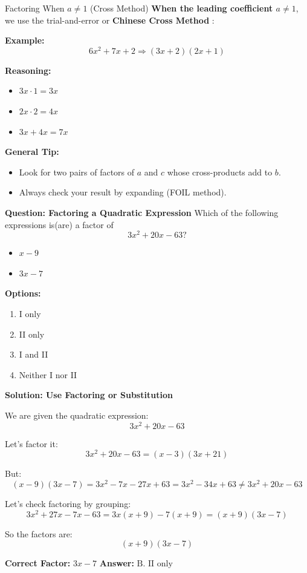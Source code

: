 \documentclass{beamer}
\begin{document}
\begin{frame}{Factoring When $a \ne 1$ (Cross Method)}
\small
\textbf{When the leading coefficient $a \ne 1$}, we use the trial-and-error or \textbf{Chinese Cross Method }:

\vspace{0.3cm}
\textbf{Example:}
\[
6x^2 + 7x + 2
\Rightarrow (3x + 2)(2x + 1)
\]

\textbf{Reasoning:}
\begin{itemize}
    \item $3x \cdot 1 = 3x$
    \item $2x \cdot 2 = 4x$
    \item $3x + 4x = 7x$
\end{itemize}

\vspace{0.2cm}
\textbf{General Tip:}
\begin{itemize}
    \item Look for two pairs of factors of $a$ and $c$ whose cross-products add to $b$.
    \item Always check your result by expanding (FOIL method).
\end{itemize}
\end{frame}


\begin{frame}{\textbf{Question: Factoring a Quadratic Expression}}
Which of the following expressions is(are) a factor of 
\[
3x^2 + 20x - 63?
\]

\begin{itemize}
    \item[I.] \(x - 9\)
    \item[II.] \(3x - 7\)
\end{itemize}

\textbf{Options:}
\begin{enumerate}
    \item[A.] I only
    \item[B.] II only
    \item[C.] I and II
    \item[D.] Neither I nor II
\end{enumerate}
\end{frame}


\begin{frame}{\textbf{Solution: Use Factoring or Substitution}}

We are given the quadratic expression:
\[
3x^2 + 20x - 63
\]

Let's factor it:
\[
3x^2 + 20x - 63 = (x - 3)(3x + 21)
\]

But:
\[
(x - 9)(3x - 7) = 3x^2 - 7x - 27x + 63 = 3x^2 - 34x + 63 \neq 3x^2 + 20x - 63
\]

Let’s check factoring by grouping:
\[
3x^2 + 27x - 7x - 63 = 3x(x + 9) -7(x + 9) = (x + 9)(3x - 7)
\]

So the factors are:
\[
(x + 9)(3x - 7)
\]

\textbf{Correct Factor:} \(3x - 7\)
\vspace{1mm}
\textbf{Answer:} \(\boxed{\text{B. II only}}\)
\end{frame}
\end{document}

